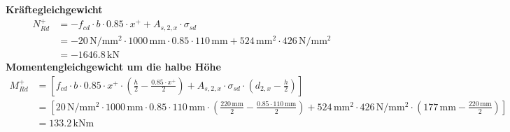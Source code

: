 \documentclass[11pt,a4paper]{article}
\begin{document}
\noindent\textbf{Kräftegleichgewicht}
\begin{equation*}
\begin{aligned}
  N_{Rd}^{+} &= -f_{cd} \cdot b \cdot 0.85 \cdot x^{+} + A_{s,2,x} \cdot \sigma_{sd} \\
  &= -20\,\mathrm{N}/\mathrm{mm}^{2} \cdot 1000\,\mathrm{mm} \cdot 0.85 \cdot 110\,\mathrm{mm} + 524\,\mathrm{mm}^{2} \cdot 426\,\mathrm{N}/\mathrm{mm}^{2} \\
  &= -1646.8\,\mathrm{kN}
\end{aligned}
\end{equation*}
\noindent\textbf{Momentengleichgewicht um die halbe Höhe}
\begin{equation*}
\begin{aligned}
  M_{Rd}^{+} &= \left[f_{cd} \cdot b \cdot 0.85 \cdot x^{+} \cdot \left(\tfrac{h}{2} - \tfrac{0.85 \cdot x^{+}}{2}\right) + A_{s,2,x} \cdot \sigma_{sd} \cdot \left(d_{2,x} - \tfrac{h}{2}\right)\right] \\
  &= \left[20\,\mathrm{N}/\mathrm{mm}^{2} \cdot 1000\,\mathrm{mm} \cdot 0.85 \cdot 110\,\mathrm{mm} \cdot \left(\tfrac{220\,\mathrm{mm}}{2} - \tfrac{0.85 \cdot 110\,\mathrm{mm}}{2}\right) + 524\,\mathrm{mm}^{2} \cdot 426\,\mathrm{N}/\mathrm{mm}^{2} \cdot \left(177\,\mathrm{mm} - \tfrac{220\,\mathrm{mm}}{2}\right)\right] \\
  &= 133.2\,\mathrm{kNm}
\end{aligned}
\end{equation*}
\end{document}
